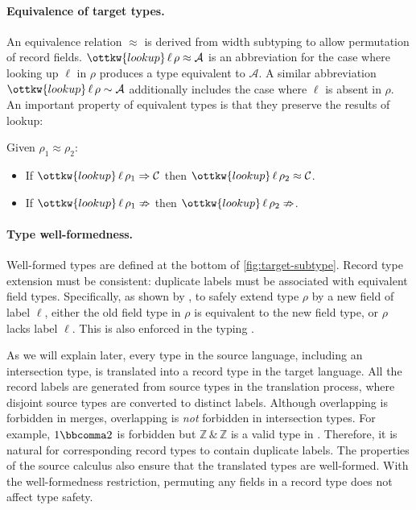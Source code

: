 \paragraph{Equivalence of target types.}
An equivalence relation $ \approx $ is derived from width subtyping to allow
permutation of record fields. $\ottkw{lookup} \, \ell \, \rho  \approx  \mathcal{A}$ is an abbreviation for
the case where looking up $\ell$ in $\rho$ produces a type equivalent to
$\mathcal{A}$. A similar abbreviation $\ottkw{lookup} \, \ell \, \rho  \sim  \mathcal{A}$ additionally includes
the case where $\ell$ is absent in $\rho$. An important property of
equivalent types is that they preserve the results of lookup:

\begin{lemma}\label{thm:lookup}
  Given $\rho_{{\mathrm{1}}}  \approx  \rho_{{\mathrm{2}}}$: \begin{itemize}
  \item If $\ottkw{lookup} \, \ell \, \rho_{{\mathrm{1}}}  \Rightarrow  \mathcal{C}$ then $\ottkw{lookup} \, \ell \, \rho_{{\mathrm{2}}}  \approx  \mathcal{C}$.
  \item If $\ottkw{lookup} \, \ell \, \rho_{{\mathrm{1}}}  \nRightarrow$ then $\ottkw{lookup} \, \ell \, \rho_{{\mathrm{2}}}  \nRightarrow$.
  \end{itemize}
\end{lemma}

\paragraph{Type well-formedness.}
Well-formed types are defined at the bottom of \autoref{fig:target-subtype}.
Record type extension must be consistent: duplicate labels must be associated
with equivalent field types. Specifically, as shown by , to safely
extend type $\rho$ by a new field of label $\ell$, either the old field type
in $\rho$ is equivalent to the new field type, or $\rho$ lacks label $\ell$.
This is also enforced in the typing .

As we will explain later, every type in the source language, including an
intersection type, is translated into a record type in the target language. All
the record labels are generated from source types in the translation process,
where disjoint source types are converted to distinct labels. Although
overlapping is forbidden in merges, overlapping is \emph{not} forbidden in
intersection types. For example, $1  \bbcomma  2$ is forbidden but $ \mathbb{Z}   \, {\&} \,   \mathbb{Z} $
is a valid type in \lambdaiplus. Therefore, it is natural for corresponding
record types to contain duplicate labels. The properties of the source calculus
also ensure that the translated types are well-formed. With the well-formedness
restriction, permuting any fields in a record type does not affect type safety.

